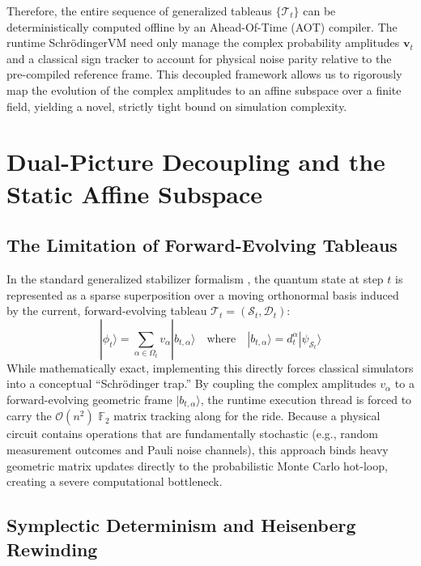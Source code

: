 \documentclass[aps,prx,reprint,superscriptaddress,nofootinbib]{revtex4-2}
\theoremstyle{definition}
\newcommand{\svm}{Schr\"odingerVM}
\begin{document}
Therefore, the entire sequence of generalized tableaus $\{ \mathcal{T}_t \}$ can be deterministically computed offline by an Ahead-Of-Time (AOT) compiler. The runtime \svm{} need only manage the complex probability amplitudes $\mathbf{v}_t$ and a classical sign tracker to account for physical noise parity relative to the pre-compiled reference frame. This decoupled framework allows us to rigorously map the evolution of the complex amplitudes to an affine subspace over a finite field, yielding a novel, strictly tight bound on simulation complexity.

\section{Dual-Picture Decoupling and the Static Affine Subspace}
\label{sec:algebra}

\subsection{The Limitation of Forward-Evolving Tableaus}

In the standard generalized stabilizer formalism \cite{yoder2012, li2025soft}, the quantum state at step $t$ is represented as a sparse superposition over a moving orthonormal basis induced by the current, forward-evolving tableau $\mathcal{T}_t = (\mathcal{S}_t, \mathcal{D}_t)$:
\begin{equation}
    |\phi_t\rangle = \sum_{\alpha \in \Omega_t} v_\alpha |b_{t,\alpha}\rangle \quad \text{where} \quad |b_{t,\alpha}\rangle = d_{t}^\alpha |\psi_{\mathcal{S}_t}\rangle
\end{equation}
While mathematically exact, implementing this directly forces classical simulators into a conceptual ``Schr\"odinger trap.'' By coupling the complex amplitudes $v_\alpha$ to a forward-evolving geometric frame $|b_{t,\alpha}\rangle$, the runtime execution thread is forced to carry the $\mathcal{O}(n^2)$ $\mathbb{F}_2$ matrix tracking along for the ride. Because a physical circuit contains operations that are fundamentally stochastic (e.g., random measurement outcomes and Pauli noise channels), this approach binds heavy geometric matrix updates directly to the probabilistic Monte Carlo hot-loop, creating a severe computational bottleneck.

\subsection{Symplectic Determinism and Heisenberg Rewinding}
\end{document}
